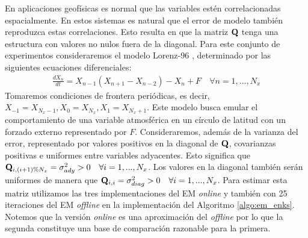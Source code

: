 En aplicaciones geofísicas es normal que las variables estén correlacionadas espacialmente. En estos sistemas es natural que el error de modelo también reproduzca estas correlaciones. Esto resulta en que la matriz $\mathbf{Q}$ tenga una estructura con valores no nulos fuera de la diagonal. Para este conjunto de experimentos consideraremos el modelo Lorenz-96 \citep{Lorenz1996}, determinado por las siguientes ecuaciones diferenciales:
\begin{align}
    \frac{d X_n}{d t} = X_{n-1}(X_{n+1} - X_{n-2}) - X_n + F \hspace{1em} \forall n = 1, ..., N_x 
\end{align}
Tomaremos condiciones de frontera periódicas, es decir, $X_{-1} = X_{N_x-1}, X_0 = X_{N_x}, X_1 = X_{N_x+1}$. Este modelo busca emular el comportamiento de una variable atmosférica en un círculo de latitud con un forzado externo representado por $F$. Consideraremos, además de la varianza del error, representado por valores positivos en la diagonal de $\mathbf{Q}$, covarianzas positivas e uniformes entre variables adyacentes. Esto significa que $\mathbf{Q}_{i, (i+1)\%N_x} = \sigma_{ady}^2 > 0 \hspace{1em} \forall i = 1, ..., N_x$. Los valores en la diagonal también serán uniformes de manera que $\mathbf{Q}_{i, i} = \sigma_{diag}^2 > 0 \hspace{1em} \forall i = 1, ..., N_x$. Para estimar esta matriz utilizamos las tres implementaciones del EM \textit{online} y también con 25 iteraciones del EM \textit{offline} en la implementación del Algoritmo \ref{algo:em_enks}. Notemos que la versión \textit{online} es una aproximación del \textit{offline} por lo que la segunda constituye una base de comparación razonable para la primera.

